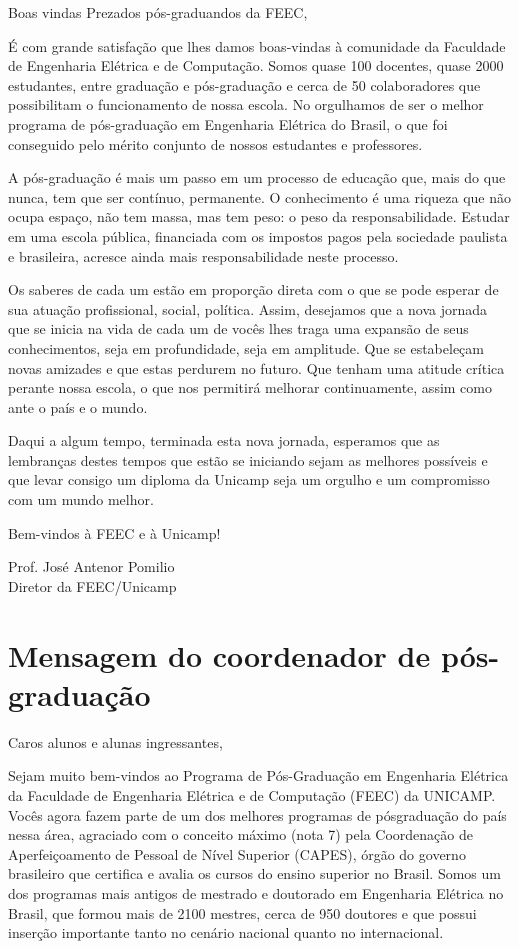 \begin{story}{Boas vindas}
Prezados pós-graduandos da FEEC,

É com grande satisfação que lhes damos boas-vindas à comunidade da Faculdade de Engenharia Elétrica e de Computação. Somos quase 100 docentes, quase 2000 estudantes, entre graduação e pós-graduação e cerca de 50 colaboradores que possibilitam o funcionamento de nossa escola. No orgulhamos de ser o melhor programa de pós-graduação em Engenharia Elétrica do Brasil, o que foi conseguido pelo mérito conjunto de nossos estudantes e professores.

A pós-graduação é mais um passo em um processo de educação que, mais do que nunca, tem que ser contínuo, permanente. O conhecimento é uma riqueza que não ocupa espaço, não tem massa, mas tem peso: o peso da responsabilidade. Estudar em uma escola pública, financiada com os impostos pagos pela sociedade paulista e brasileira, acresce ainda mais responsabilidade neste processo.

Os saberes de cada um estão em proporção direta com o que se pode esperar de sua atuação profissional, social, política. Assim, desejamos que a nova jornada que se inicia na vida de cada um de vocês lhes traga uma expansão de seus conhecimentos, seja em profundidade, seja em amplitude. Que se estabeleçam novas amizades e que estas perdurem no futuro. Que tenham uma atitude crítica perante nossa escola, o que nos permitirá melhorar continuamente, assim como ante o país e o mundo.

Daqui a algum tempo, terminada esta nova jornada, esperamos que as lembranças destes tempos que estão se iniciando sejam as melhores possíveis e que levar consigo um diploma da Unicamp seja um orgulho e um compromisso com um mundo melhor.

Bem-vindos à FEEC e à Unicamp!

\begin{flushright}
Prof. José Antenor Pomilio \\
Diretor da FEEC/Unicamp
\end{flushright}

\section*{Mensagem do coordenador de pós-graduação}

Caros alunos e alunas ingressantes,

Sejam muito bem-vindos ao Programa de Pós-Graduação em Engenharia Elétrica da Faculdade de Engenharia Elétrica e de Computação (FEEC) da UNICAMP. Vocês agora fazem parte de um dos melhores programas de pósgraduação do país nessa área, agraciado com o conceito máximo (nota 7) pela Coordenação de Aperfeiçoamento de Pessoal de Nível Superior (CAPES), órgão do governo brasileiro que certifica e avalia os cursos do ensino superior no Brasil. Somos um dos programas mais antigos de mestrado e doutorado em Engenharia Elétrica no Brasil, que formou mais de 2100 mestres, cerca de 950 doutores e que possui inserção importante tanto no cenário nacional quanto no internacional.


\end{story}
